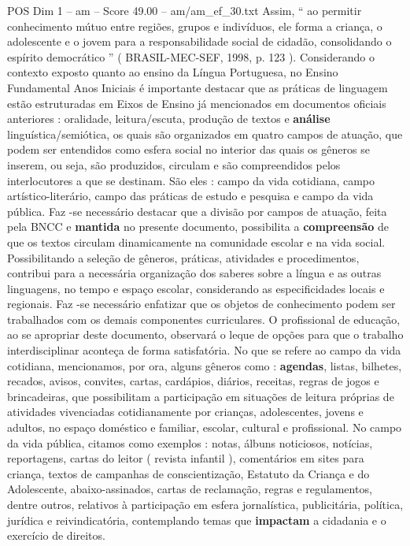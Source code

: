 \begin{textsample}{POS Dim 1 – am – Score 49.00 – am/am\_ef\_30.txt}
Assim, “ ao permitir conhecimento mútuo entre regiões, grupos e indivíduos, ele forma a criança, o adolescente e o jovem para a responsabilidade social de cidadão, consolidando o espírito democrático ” ( BRASIL-MEC-SEF, 1998, p. 123 ).
Considerando o contexto exposto quanto ao ensino da Língua Portuguesa, no Ensino Fundamental Anos Iniciais é importante destacar que as práticas de linguagem estão estruturadas em Eixos de Ensino já mencionados em documentos oficiais anteriores : oralidade, leitura/escuta, produção de textos e \textbf{análise} linguística/semiótica, os quais são organizados em quatro campos de atuação, que podem ser entendidos como esfera social no interior das quais os gêneros se inserem, ou seja, são produzidos, circulam e são compreendidos pelos interlocutores a que se destinam.
São eles : campo da vida cotidiana, campo artístico-literário, campo das práticas de estudo e pesquisa e campo da vida pública.
Faz -se necessário destacar que a divisão por campos de atuação, feita pela BNCC e \textbf{mantida} no presente documento, possibilita a \textbf{compreensão} de que os textos circulam dinamicamente na comunidade escolar e na vida social.
Possibilitando a seleção de gêneros, práticas, atividades e procedimentos, contribui para a necessária organização dos saberes sobre a língua e as outras linguagens, no tempo e espaço escolar, considerando as especificidades locais e regionais.
Faz -se necessário enfatizar que os objetos de conhecimento podem ser trabalhados com os demais componentes curriculares.
O profissional de educação, ao se apropriar deste documento, observará o leque de opções para que o trabalho interdisciplinar aconteça de forma satisfatória.
No que se refere ao campo da vida cotidiana, mencionamos, por ora, alguns gêneros como : \textbf{agendas}, listas, bilhetes, recados, avisos, convites, cartas, cardápios, diários, receitas, regras de jogos e brincadeiras, que possibilitam a participação em situações de leitura próprias de atividades vivenciadas cotidianamente por crianças, adolescentes, jovens e adultos, no espaço doméstico e familiar, escolar, cultural e profissional.
No campo da vida pública, citamos como exemplos : notas, álbuns noticiosos, notícias, reportagens, cartas do leitor ( revista infantil ), comentários em sites para criança, textos de campanhas de conscientização, Estatuto da Criança e do Adolescente, abaixo-assinados, cartas de reclamação, regras e regulamentos, dentre outros, relativos à participação em esfera jornalística, publicitária, política, jurídica e reivindicatória, contemplando temas que \textbf{impactam} a cidadania e o exercício de direitos.

\end{textsample}
